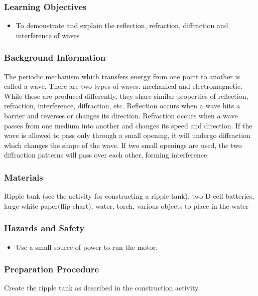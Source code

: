 \subsubsection*{Learning Objectives}
\begin{itemize}
\item{To demonstrate and explain the reflection, refraction, diffraction and interference of waves} 
\end{itemize}

\subsubsection*{Background Information}
The periodic mechanism which transfers energy from one point to another is called a wave.  There are two types of waves: mechanical and electromagnetic.  While these are produced differently, they share similar properties of reflection, refraction, interference, diffraction, etc.  Reflection occurs when a wave hits a barrier and reverses or changes its direction.  Refraction occurs when a wave passes from one medium into another and changes its speed and direction.  If the wave is allowed to pass only through a small opening, it will undergo diffraction which changes the shape of the wave.  If two small openings are used, the two diffraction patterns will pass over each other, forming interference.

\subsubsection*{Materials}
Ripple tank (see the activity for constructing a ripple tank), two D-cell batteries, large white paper(flip chart), water, torch, various objects to place in the water

\subsubsection*{Hazards and Safety}
\begin{itemize}
\item{Use a small source of power to run the motor.} 
\end{itemize}

\subsubsection*{Preparation Procedure}
Create the ripple tank as described in the construction activity.

